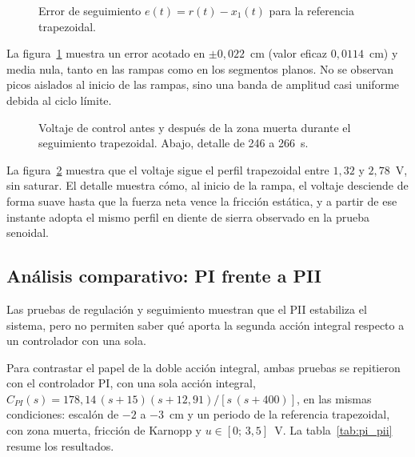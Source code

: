 \begin{figure}[ht]
    \centering
    
    \caption[Seguimiento trapezoidal: error]{Error de seguimiento $e(t)=r(t)-x_1(t)$ para la referencia trapezoidal.}
    \label{fig:trap_error}
\end{figure}

La figura~\ref{fig:trap_error} muestra un error acotado en $\pm 0{,}022$~cm (valor eficaz $0{,}0114$~cm) y media nula, tanto en las rampas como en los segmentos planos. No se observan picos aislados al inicio de las rampas, sino una banda de amplitud casi uniforme debida al ciclo límite.

\FloatBarrier

\begin{figure}[ht]
    \centering
    
    \caption[Seguimiento trapezoidal: señal de control]{Voltaje de control antes y después de la zona muerta durante el seguimiento trapezoidal. Abajo, detalle de 246 a 266~s.}
    \label{fig:trap_ctrl}
\end{figure}

La figura~\ref{fig:trap_ctrl} muestra que el voltaje sigue el perfil trapezoidal entre $1{,}32$ y $2{,}78$~V, sin saturar. El detalle muestra cómo, al inicio de la rampa, el voltaje desciende de forma suave hasta que la fuerza neta vence la fricción estática, y a partir de ese instante adopta el mismo perfil en diente de sierra observado en la prueba senoidal.

\FloatBarrier

\subsection{Análisis comparativo: PI frente a PII}

Las pruebas de regulación y seguimiento muestran que el PII estabiliza el sistema, pero no permiten saber qué aporta la segunda acción integral respecto a un controlador con una sola.

Para contrastar el papel de la doble acción integral, ambas pruebas se repitieron con el controlador PI, con una sola acción integral, $C_{PI}(s)=178{,}14\,(s+15)(s+12{,}91)/[s\,(s+400)]$, en las mismas condiciones: escalón de $-2$ a $-3$~cm y un periodo de la referencia trapezoidal, con zona muerta, fricción de Karnopp y $u\in[0;\,3{,}5]$~V. La tabla~\ref{tab:pi_pii} resume los resultados.


